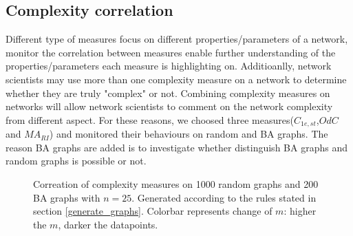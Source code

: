 \documentclass[12pt]{article}
\begin{document}
{\subsection{Complexity correlation}
Different type of measures focus on different properties/parameters of a network, monitor the correlation between measures enable further understanding of the properties/parameters each measure is highlighting on. Additioanlly, network scientists may use more than one complexity measure on a network to determine whether they are truly "complex" or not. Combining complexity measures on networks will allow network scientists to comment on the network complexity from different aspect. For these reasons, we choosed three measures($C_{1e,st}$,$OdC$ and $MA_{RI}$) and monitored their behaviours on random and BA graphs. The reason BA graphs are added is to investigate whether distinguish BA graphs and random graphs is possible or not.\\
\begin{figure}[h!]
    \caption{Correation of complexity measures on 1000 random graphs and 200 BA graphs with $n=25$. Generated according to the rules stated in section \ref{generate_graphs}. Colorbar represents change of $m$: higher the $m$, darker the datapoints.}
    \label{fig:correlation}
\end{figure}

}
\end{document}
